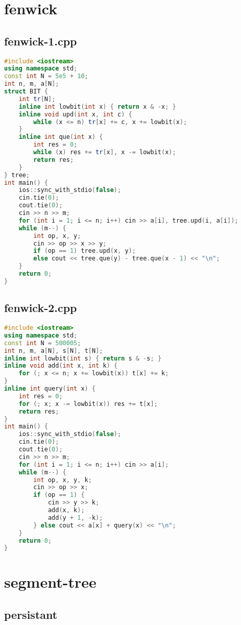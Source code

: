 \documentclass[9pt, a4paper, oneside]{book}
\begin{document}
\section{fenwick}
\subsection{fenwick-1.cpp}
\begin{lstlisting}[language={C++}]
#include <iostream>
using namespace std;
const int N = 5e5 + 10;
int n, m, a[N];
struct BIT {
    int tr[N];
    inline int lowbit(int x) { return x & -x; }
    inline void upd(int x, int c) {
        while (x <= n) tr[x] += c, x += lowbit(x);
    }
    inline int que(int x) {
        int res = 0;
        while (x) res += tr[x], x -= lowbit(x);
        return res;
    }
} tree;
int main() {
    ios::sync_with_stdio(false);
    cin.tie(0);
    cout.tie(0);
    cin >> n >> m;
    for (int i = 1; i <= n; i++) cin >> a[i], tree.upd(i, a[i]);
    while (m--) {
        int op, x, y;
        cin >> op >> x >> y;
        if (op == 1) tree.upd(x, y);
        else cout << tree.que(y) - tree.que(x - 1) << "\n";
    }
    return 0;
}\end{lstlisting}
\subsection{fenwick-2.cpp}
\begin{lstlisting}[language={C++}]
#include <iostream>
using namespace std;
const int N = 500005;
int n, m, a[N], s[N], t[N];
inline int lowbit(int s) { return s & -s; }
inline void add(int x, int k) {
    for (; x <= n; x += lowbit(x)) t[x] += k;
}
inline int query(int x) {
    int res = 0;
    for (; x; x -= lowbit(x)) res += t[x];
    return res;
}
int main() {
    ios::sync_with_stdio(false);
    cin.tie(0);
    cout.tie(0);
    cin >> n >> m;
    for (int i = 1; i <= n; i++) cin >> a[i];
    while (m--) {
        int op, x, y, k;
        cin >> op >> x;
        if (op == 1) {
            cin >> y >> k;
            add(x, k);
            add(y + 1, -k);
        } else cout << a[x] + query(x) << "\n";
    }
    return 0;
}\end{lstlisting}
\section{segment-tree}
\subsection{persistant}
\end{document}

